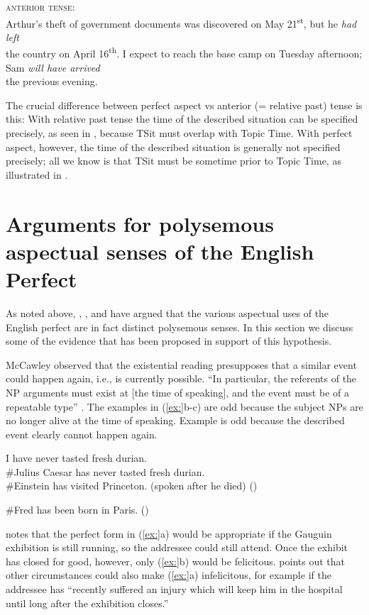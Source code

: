 \ea
\textsc{anterior tense:}\\
\ea  Arthur’s theft of government documents was discovered on May 21\textsuperscript{st}, but he \textit{had left} \\
the country on April 16\textsuperscript{th}.
\ex  I expect to reach the base camp on Tuesday afternoon; Sam \textit{will have arrived} \\
the previous evening.
\z \z


The crucial difference between perfect aspect vs anterior (= relative past) tense is this: With relative past tense the time of the described situation can be specified precisely, as seen in , because TSit must overlap with Topic Time. With perfect aspect, however, the time of the described situation is generally not specified precisely; all we know is that TSit must be sometime prior to Topic Time, as illustrated in .


\section{Arguments for polysemous aspectual senses of the English Perfect}\label{sec:22.4}

As noted above, \citet{McCawley1971,McCawley1981}, \citet{Michaelis1994,Michaelis1998}, and \citet{Kiparsky2002} have argued that the various aspectual uses of the English perfect are in fact distinct polysemous senses. In this section we discuss some of the evidence that has been proposed in support of this hypothesis.


McCawley observed that the existential reading presupposes that a similar event could happen again, i.e., is currently possible. “In particular, the referents of the NP arguments must exist at [the time of speaking], and the event must be of a repeatable type” \citep{Kiparsky2002}. The examples in (\ref{ex:}b-c) are odd because the subject NPs are no longer alive at the time of speaking. Example  is odd because the described event clearly cannot happen again. 


\ea
\ea I have never tasted fresh durian.\\
\ex \#Julius Caesar has never tasted fresh durian.\\
\ex \#Einstein has visited Princeton. (spoken after he died) (\citealt{Chomsky1970})
                       \z
\z

\ea
\#Fred has been born in Paris.  (\citealt{Kiparsky2002})
\z


\citet[33]{Leech1971} notes that the perfect form in (\ref{ex:}a) would be appropriate if the Gauguin exhibition is still running, so the addressee could still attend. Once the exhibit has closed for good, however, only (\ref{ex:}b) would be felicitous. \citet[107]{McCawley1971} points out that other circumstances could also make (\ref{ex:}a) infelicitous, for example if the addressee has “recently suffered an injury which will keep him in the hospital until long after the exhibition closes.”


